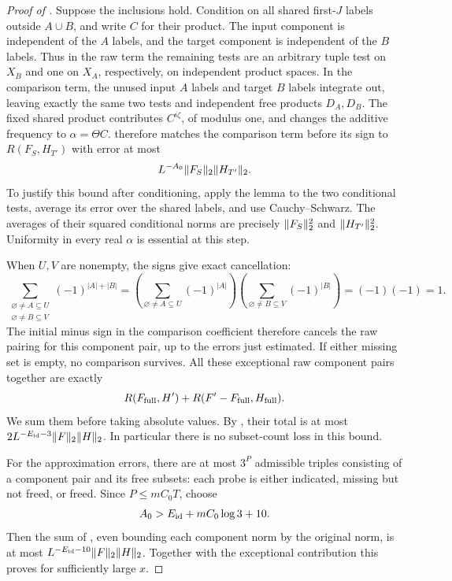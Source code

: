 \begin{proof}[Proof of ]
Suppose the inclusions hold.  Condition on all shared
first-$J$ labels outside $A\cup B$, and write $C$ for their
product.  The input component is independent of the $A$
labels, and the target component is independent of the
$B$ labels.  Thus in the raw term the remaining tests are
an arbitrary tuple test on $X_B$ and one on $X_A$,
respectively, on independent product spaces.  In the
comparison term, the unused input $A$ labels and target
$B$ labels integrate out, leaving exactly the same two
tests and independent free products $D_A,D_B$.
The fixed shared product contributes $C^{i\zeta}$,
of modulus one, and changes the additive frequency to
$\alpha=\Theta C$.   therefore
matches the comparison term before its sign to
$R(F_S,H_{T'})$ with error at most
\begin{equation}\label{eq:ideal-component-error}
 L^{-A_0}\lVert F_S\rVert_2\lVert H_{T'}\rVert_2.
\end{equation}
To justify this bound after conditioning, apply the lemma
to the two conditional tests, average its error over the
shared labels, and use Cauchy--Schwarz.  The averages of
their squared conditional norms are precisely
$\lVert F_S\rVert_2^2$ and $\lVert H_{T'}\rVert_2^2$.
Uniformity in every real $\alpha$ is essential at this step.

When $U,V$ are nonempty, the signs give exact cancellation:
\begin{equation}\label{eq:ideal-inclusion-exclusion}
 \sum_{\substack{\varnothing\ne A\subseteq U\\
                  \varnothing\ne B\subseteq V}}
      (-1)^{|A|+|B|}
 =\left(\sum_{\varnothing\ne A\subseteq U}(-1)^{|A|}\right)
  \left(\sum_{\varnothing\ne B\subseteq V}(-1)^{|B|}\right)
 =(-1)(-1)=1.
\end{equation}
The initial minus sign in the comparison coefficient
therefore cancels the raw pairing for this component pair,
up to the errors just estimated.  If either missing set is
empty, no comparison survives.  All these exceptional raw
component pairs together are exactly
\[
 R(F_{\rm full},H')+
 R(F'-F_{\rm full},H_{\rm full}).
\]
We sum them before taking absolute values.  By
, their
total is at most
$2L^{-E_{\rm id}-3}\lVert F\rVert_2\lVert H\rVert_2$.
In particular there is no subset-count loss in this bound.

For the approximation errors, there are at most $3^P$
admissible triples consisting of a component pair and its
free subsets: each probe is either indicated, missing but
not freed, or freed.  Since $P\leq mC_0T$, choose
\[
 A_0>E_{\rm id}+mC_0\log3+10.
\]
Then the sum of , even
bounding each component norm by the original norm, is
at most $L^{-E_{\rm id}-10}\lVert F\rVert_2\lVert H\rVert_2$.
Together with the exceptional contribution this proves
 for sufficiently large $x$.


\end{proof}
